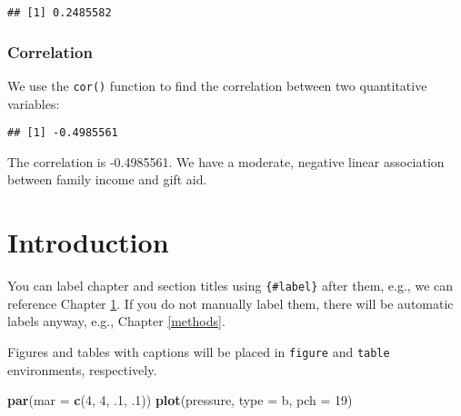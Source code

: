 \documentclass[
]{book}
\newenvironment{Shaded}{\begin{snugshade}}{\end{snugshade}}
\newcommand{\AttributeTok}[1]{\textcolor[rgb]{0.13,0.29,0.53}{#1}}
\newcommand{\DecValTok}[1]{\textcolor[rgb]{0.00,0.00,0.81}{#1}}
\newcommand{\DocumentationTok}[1]{\textcolor[rgb]{0.56,0.35,0.01}{\textbf{\textit{#1}}}}
\newcommand{\FunctionTok}[1]{\textcolor[rgb]{0.13,0.29,0.53}{\textbf{#1}}}
\newcommand{\NormalTok}[1]{#1}
\newcommand{\SpecialCharTok}[1]{\textcolor[rgb]{0.81,0.36,0.00}{\textbf{#1}}}
\newcommand{\StringTok}[1]{\textcolor[rgb]{0.31,0.60,0.02}{#1}}
\begin{document}
\begin{verbatim}
## [1] 0.2485582
\end{verbatim}

\hypertarget{correlation-1}{%
\subsection*{Correlation}\label{correlation-1}}

We use the \texttt{cor()} function to find the correlation between two quantitative variables:

\begin{Shaded}
\end{Shaded}

\begin{verbatim}
## [1] -0.4985561
\end{verbatim}

The correlation is -0.4985561. We have a moderate, negative linear association between family income and gift aid.

\hypertarget{intro}{%
\chapter{Introduction}\label{intro}}

You can label chapter and section titles using \texttt{\{\#label\}} after them, e.g., we can reference Chapter \ref{intro}. If you do not manually label them, there will be automatic labels anyway, e.g., Chapter \ref{methods}.

Figures and tables with captions will be placed in \texttt{figure} and \texttt{table} environments, respectively.

\begin{Shaded}
\begin{Highlighting}[]
\FunctionTok{par}\NormalTok{(}\AttributeTok{mar =} \FunctionTok{c}\NormalTok{(}\DecValTok{4}\NormalTok{, }\DecValTok{4}\NormalTok{, .}\DecValTok{1}\NormalTok{, .}\DecValTok{1}\NormalTok{))}
\FunctionTok{plot}\NormalTok{(pressure, }\AttributeTok{type =} \StringTok{\textquotesingle{}b\textquotesingle{}}\NormalTok{, }\AttributeTok{pch =} \DecValTok{19}\NormalTok{)}
\end{Highlighting}
\end{Shaded}
\end{document}
